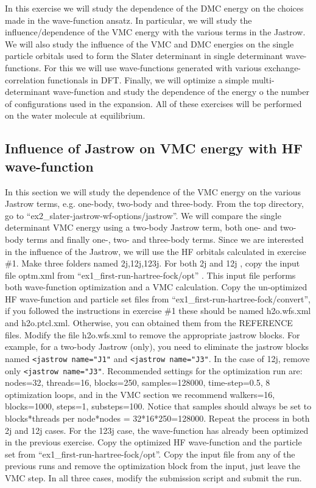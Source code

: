 In this exercise we will study the dependence of the DMC energy on the choices made
in the wave-function ansatz. In particular, we will study the influence/dependence of the
VMC energy with the various terms in the Jastrow. We will also study the influence of
the VMC and DMC energies on the single particle orbitals used to form the Slater determinant 
in single determinant wave-functions. For this we will use wave-functions generated
with various exchange-correlation functionals in DFT. Finally, we will optimize a simple
multi-determinant wave-function and study the dependence of the energy o the number of
configurations used in the expansion. All of these exercises will be performed on the water 
molecule at equilibrium.


\subsection{Influence of Jastrow on VMC energy with HF wave-function}
In this section we will study the dependence of the VMC energy on the various Jastrow
terms, e.g. one-body, two-body and three-body. From the top directory, go to ``ex2\_slater-jastrow-wf-options/jastrow''. 
We will compare the single determinant VMC energy using a two-body 
Jastrow term, both one- and two-body terms and finally one-, two- and three-body
terms. Since we are interested in the influence of the Jastrow, we will use the HF orbitals
calculated in exercise \#1. Make three folders named 2j,12j,123j. For both 2j and
12j %
, copy the input file optm.xml %
from ``ex1\_first-run-hartree-fock/opt'' . This input file performs both wave-function optimization 
and a VMC calculation. Copy the un-optimized HF wave-function and particle set files
from ``ex1\_first-run-hartree-fock/convert'', if you followed the instructions in exercise \#1 these should be
named h2o.wfs.xml and h2o.ptcl.xml. Otherwise, you can obtained them from the
REFERENCE files. Modify the file h2o.wfs.xml to remove the appropriate jastrow
blocks. For example, for a two-body Jastrow (only), you need to eliminate the jastrow
blocks named \texttt{<jastrow name="J1"} and \texttt{<jastrow name="J3"}. In the case of 12j, remove
only \texttt{<jastrow name="J3"}. Recommended settings for the optimization run are: nodes=32,
threads=16, blocks=250, samples=128000, time-step=0.5, 8 optimization loops, and in the
VMC section we recommend walkers=16, blocks=1000, steps=1, substeps=100. Notice that
samples should always be set to blocks*threads per node*nodes = 32*16*250=128000. Repeat 
the process in both 2j and 12j cases. For the 123j case, the wave-function has
already been optimized in the previous exercise. Copy the optimized HF wave-function and
the particle set from ``ex1\_first-run-hartree-fock/opt''. Copy the input file from any of the previous runs and remove the optimization block from the
input, just leave the VMC step. In all three cases, modify the submission script and submit the run.

